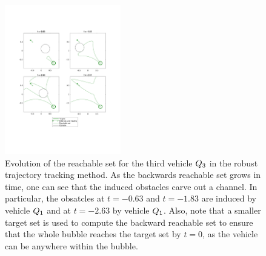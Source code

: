 \begin{figure}[h]
  \centering
  \includegraphics[width=0.45\textwidth]{"fig/rtt_rs3"}
  \caption{Evolution of the reachable set for the third vehicle $Q_3$ in the robust trajectory tracking method. As the backwards reachable set grows in time, one can see that the induced obstacles carve out a channel. In particular, the obsatcles at $t =-0.63$ and $t=-1.83$ are induced by vehicle $Q_1$ and at $t =-2.63$ by vehicle $Q_1$. Also, note that a smaller target set is used to compute the backward reachable set to ensure that the whole bubble reaches the target set by $t=0$, as the vehicle can be anywhere within the bubble.}
  \label{fig:rtt_rs3}
\end{figure}